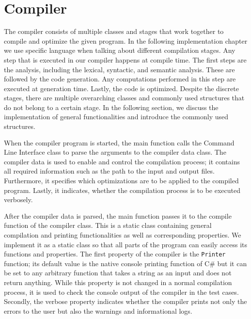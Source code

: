 \section{Compiler}
\label{sec:implementation_compiler}
The compiler consists of multiple classes and stages that work together to compile and optimize the given program. In the following implementation chapter we use specific language when talking about different compilation stages. Any step that is executed in our compiler happens at compile time. The first steps are the analysis, including the lexical, syntactic, and semantic analysis. These are followed by the code generation. Any computations performed in this step are executed at generation time. Lastly, the code is optimized. 
Despite the discrete stages, there are multiple overarching classes and commonly used structures that do not belong to a certain stage. In the following section, we discuss the implementation of general functionalities and introduce the commonly used structures.

When the compiler program is started, the main function calls the Command Line Interface class to parse the arguments to the compiler data class. The compiler data is used to enable and control the compilation process; it contains all required information such as the path to the input and output files. Furthermore, it specifies which optimizations are to be applied to the compiled program. Lastly, it indicates, whether the compilation process is to be executed verbosely. 

After the compiler data is parsed, the main function passes it to the compile function of the compiler class. This is a static class containing general compilation and printing functionalities as well as corresponding properties. We implement it as a static class so that all parts of the program can easily access its functions and properties. The first property of the compiler is the \texttt{Printer} function; its default value is the native console printing function of C\# but it can be set to any arbitrary function that takes a string as an input and does not return anything. While this property is not changed in a normal compilation process, it is used to check the console output of the compiler in the test cases. Secondly, the verbose property indicates whether the compiler prints not only the errors to the user but also the warnings and informational logs.

